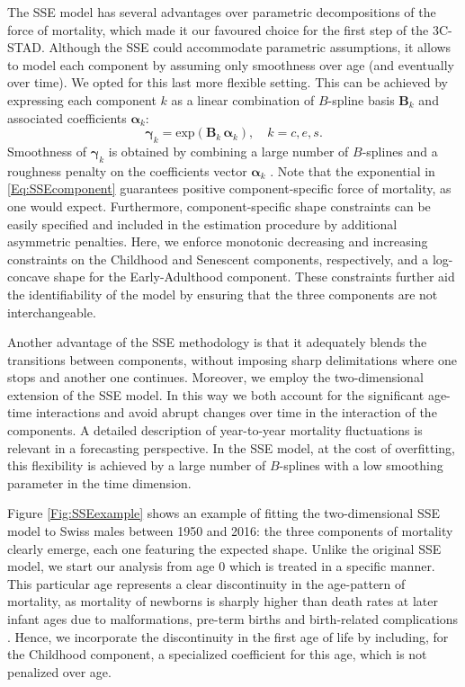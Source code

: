 \documentclass[Thesis]{subfiles}
\begin{document}
The SSE model has several advantages over parametric decompositions of the force of mortality, which made it our favoured choice for the first step of the 3C-STAD. Although the SSE could accommodate parametric assumptions, it allows to model each component by assuming only smoothness over age (and eventually over time). We opted for this last more flexible setting. This can be achieved by expressing each component $k$ as a linear combination of $B$-spline basis $\bm{B}_k$ and associated coefficients $\bm{\alpha}_k$: 
\begin{equation}\label{Eq:SSEcomponent}
\bm{\gamma}_k = \mathrm{exp} \left( \bm{B}_k\,\bm{\alpha}_k\right), \quad k=c,e,s. 
\end{equation}
Smoothness of $\bm{\gamma}_k$ is obtained by combining a large number of $B$-splines and a roughness penalty on the coefficients vector $\bm{\alpha}_k$ \citep{eilers1996flexible}. Note that the exponential in \eqref{Eq:SSEcomponent} guarantees positive component-specific force of mortality, as one would expect. Furthermore, component-specific shape constraints can be easily specified and included in the estimation procedure by additional asymmetric penalties. Here, we enforce monotonic decreasing and increasing constraints on the Childhood and Senescent components, respectively, and a log-concave shape for the Early-Adulthood component. These constraints further aid the identifiability of the model by ensuring that the three components are not interchangeable.

Another advantage of the SSE methodology is that it adequately blends the transitions between components, without imposing sharp delimitations where one stops and another one continues. Moreover, we employ the two-dimensional extension of the SSE model. In this way we both account for the significant age-time interactions and avoid abrupt changes over time in the interaction of the components. A detailed description of year-to-year mortality fluctuations is relevant in a forecasting perspective. In the SSE model, at the cost of overfitting, this flexibility is achieved by a large number of $B$-splines with a low smoothing parameter in the time dimension.

Figure \ref{Fig:SSEexample} shows an example of fitting the two-dimensional SSE model to Swiss males between 1950 and 2016: the three components of mortality clearly emerge, each one featuring the expected shape. Unlike the original SSE model, we start our analysis from age 0 which is treated in a specific manner. This particular age represents a clear discontinuity in the age-pattern of mortality, as mortality of newborns is sharply higher than death rates at later infant ages due to malformations, pre-term births and birth-related complications \citep{chiang1984life,camarda2016sums}. Hence, we incorporate the discontinuity in the first age of life by including, for the Childhood component, a specialized coefficient for this age, which is not penalized over age. 
\end{document}
